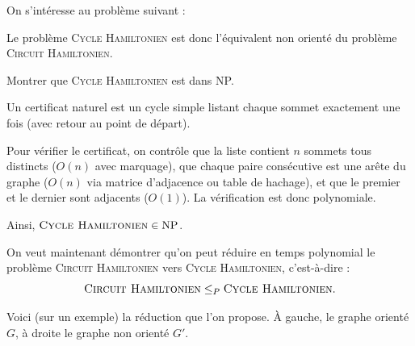 
\begingroup

\begin{exercice}[Le problème \textsc{Cycle Hamiltonien}\footnote{\textit{Source :} \url{https://www.youtube.com/watch?v=kl2k_wgYYic}.}]

  On s'intéresse au problème suivant :


  Le problème \textsc{Cycle Hamiltonien} est donc l'équivalent non orienté du problème \textsc{Circuit Hamiltonien}.

  \begin{questions}
  \item Montrer que \textsc{Cycle Hamiltonien} est dans NP.
  \end{questions}
  \begin{corrections}
    Un certificat naturel est un cycle simple listant chaque sommet exactement une fois (avec retour au point de départ).

    Pour vérifier le certificat, on contrôle que la liste contient $n$ sommets
    tous distincts ($O(n)$ avec marquage), que chaque paire consécutive est une
    arête du graphe ($O(n)$ via matrice d'adjacence ou table de hachage),
    et que le premier et le dernier sont adjacents ($O(1)$).
    La vérification est donc polynomiale.
    
    Ainsi, $\textsc{Cycle Hamiltonien} \in \text{NP}$.
  \end{corrections}
  
  On veut maintenant démontrer qu'on peut réduire en temps polynomial le problème \textsc{Circuit Hamiltonien} vers \textsc{Cycle Hamiltonien}, c'est-à-dire :
  $$\textsc{Circuit Hamiltonien} \le_P \textsc{Cycle Hamiltonien}.$$
  
  Voici (sur un exemple) la réduction que l'on propose.
  À gauche, le graphe orienté $G$, à droite le graphe non orienté $G'$.

  \begin{center}
\end{center}
\end{exercice}
